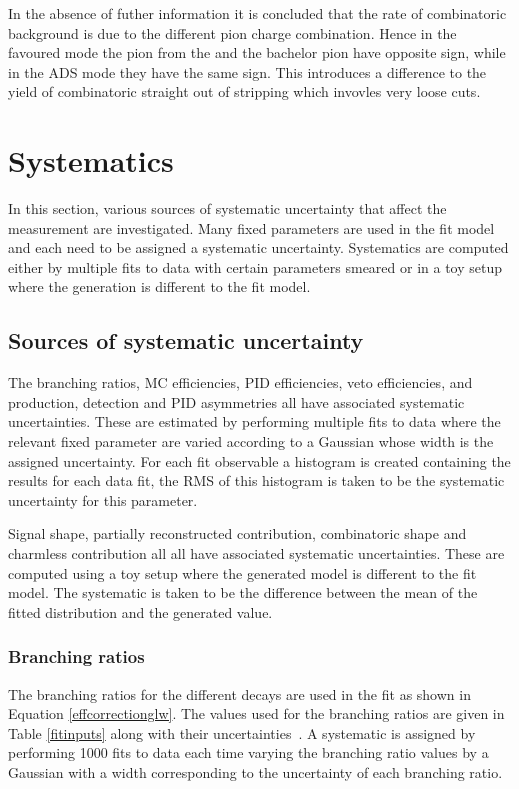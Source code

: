 In the absence of futher information it is concluded that the rate of combinatoric background is due to the different pion charge combination. Hence in the favoured mode the pion from the \D and the bachelor pion have opposite sign, while in the ADS mode they have the same sign. This introduces a difference to the yield of combinatoric straight out of stripping which invovles very loose cuts.


\clearpage

\section{Systematics}
\label{sec:systematics}

In this section, various sources of systematic uncertainty that affect the measurement are investigated. Many fixed parameters are used in the fit model and each need to be assigned a systematic uncertainty. Systematics are computed either by multiple fits to data with certain parameters smeared or in a toy setup where the generation is different to the fit model. 

\subsection{Sources of systematic uncertainty}

The branching ratios, MC efficiencies, PID efficiencies, veto efficiencies, and production, detection and PID asymmetries all have associated systematic uncertainties. These are estimated by performing multiple fits to data where the relevant fixed parameter are varied according to a Gaussian whose width is the assigned uncertainty. For each fit observable a histogram is created containing the results for each data fit, the RMS of this histogram is taken to be the systematic uncertainty for this parameter.

Signal shape, partially reconstructed contribution, combinatoric shape and charmless contribution all all have associated systematic uncertainties. These are computed using a toy setup where the generated model is different to the fit model. The systematic is taken to be the difference between the mean of the fitted distribution and the generated value.

\subsubsection{Branching ratios}

The branching ratios for the different \D decays are used in the \CP fit as shown in Equation \ref{effcorrectionglw}. The values used for the branching ratios are given in Table \ref{fitinputs} along with their uncertainties~\cite{PDG2014}. A systematic is assigned by performing 1000 fits to data each time varying the branching ratio values by a Gaussian with a width corresponding to the uncertainty of each branching ratio.

